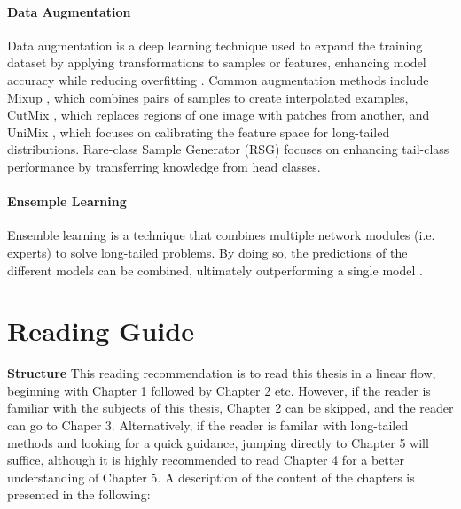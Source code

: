 \paragraph{Data Augmentation}
Data augmentation is a deep learning technique used to expand the training dataset by applying transformations to samples or features, enhancing model accuracy while reducing overfitting \cite{perez2017effectivenessdataaugmentationimage,shorten2019survey}. Common augmentation methods include Mixup \cite{zhang2018mixupempiricalriskminimization}, which combines pairs of samples to create interpolated examples, CutMix \cite{yun2019cutmixregularizationstrategytrain}, which replaces regions of one image with patches from another, and UniMix \cite{xu2021calibratedmodellongtailedvisual}, which focuses on calibrating the feature space for long-tailed distributions. Rare-class Sample Generator (RSG) \cite{wang2021rsgsimpleeffectivemodule} focuses on enhancing tail-class performance by transferring knowledge from head classes.


\paragraph{Ensemple Learning}
Ensemble learning is a technique that combines multiple network modules (i.e. experts) to solve long-tailed problems. By doing so, the predictions of the different models can be combined, ultimately outperforming a single model \cite{zhou2020bbnbilateralbranchnetworkcumulative,wang2022longtailedrecognitionroutingdiverse}.



\section{Reading Guide}

\noindent \textbf{Structure} This reading recommendation is to read this thesis in a linear flow, beginning with Chapter 1 followed by Chapter 2 etc. However, if the reader is familiar with the subjects of this thesis, Chapter 2 can be skipped, and the reader can go to Chaper 3. Alternatively, if the reader is familar with long-tailed methods and looking for a quick guidance, jumping directly to Chapter 5 will suffice, although it is highly recommended to read Chapter 4 for a better understanding of Chapter 5.
A description of the content of the chapters is presented in the following:
\vspace{1em}

